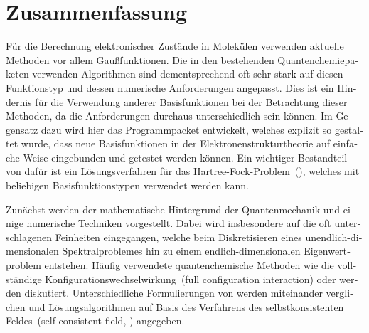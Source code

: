 %
%
\chapter*{Zusammenfassung}
{}

\begin{otherlanguage}{ngerman}
Für die Berechnung elektronischer Zustände in Molekülen
verwenden aktuelle Methoden vor allem Gaußfunktionen.
Die in den bestehenden Quantenchemiepaketen verwenden Algorithmen
sind dementsprechend oft sehr stark
auf diesen Funktionstyp und dessen numerische Anforderungen angepasst.
Dies ist ein Hindernis für die Verwendung
anderer Basisfunktionen bei der Betrachtung dieser Methoden,
da die Anforderungen durchaus unterschiedlich sein können.
Im Gegensatz dazu wird hier
das Programmpacket \molsturm entwickelt,
welches explizit so gestaltet wurde,
dass neue Basisfunktionen in der Elektronenstrukturtheorie
auf einfache Weise eingebunden und getestet werden können.
Ein wichtiger Bestandteil von \molsturm dafür ist
ein Lösungsverfahren für das Hartree-Fock-Problem~(\HF),
welches mit beliebigen Basisfunktionstypen verwendet werden kann.

Zunächst werden der mathematische Hintergrund der Quantenmechanik
und einige numerische Techniken vorgestellt.
Dabei wird insbesondere auf die oft unterschlagenen Feinheiten eingegangen,
welche beim Diskretisieren eines unendlich-dimensionalen Spektralproblemes
hin zu einem endlich-dimensionalen Eigenwertproblem entstehen.
Häufig verwendete quantenchemische Methoden
wie die vollständige Konfigurationswechselwirkung~(full configuration interaction)
oder \HF werden diskutiert.
Unterschiedliche Formulierungen von \HF werden miteinander verglichen
und
Lösungsalgorithmen auf Basis des Verfahrens des
selbstkonsistenten Feldes~(self-consistent field, \SCF) angegeben.


\end{otherlanguage}
